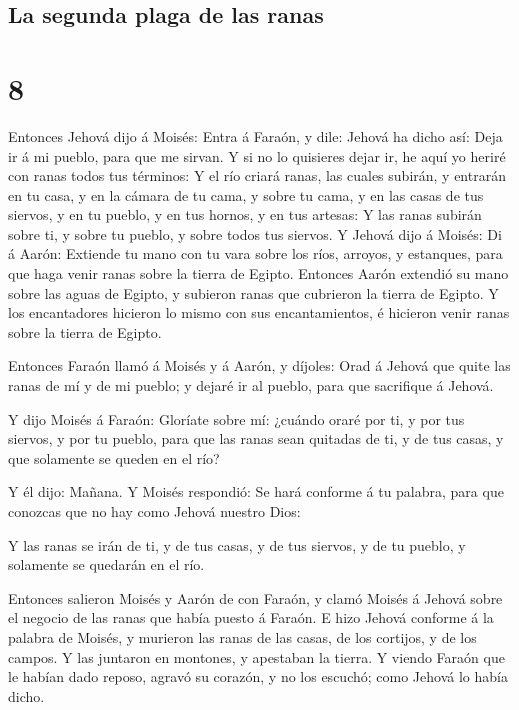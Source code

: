 \hypertarget{la-segunda-plaga-de-las-ranas}{%
\subsection{La segunda plaga de las
ranas}\label{la-segunda-plaga-de-las-ranas}}

\hypertarget{section-02-8}{%
\section{8}\label{section-02-8}}

 Entonces Jehová dijo á Moisés: Entra á Faraón, y dile:
Jehová ha dicho así: Deja ir á mi pueblo, para que me sirvan.
 Y si no lo quisieres dejar ir, he aquí yo heriré con
ranas todos tus términos:  Y el río criará ranas, las
cuales subirán, y entrarán en tu casa, y en la cámara de tu cama, y
sobre tu cama, y en las casas de tus siervos, y en tu pueblo, y en tus
hornos, y en tus artesas:  Y las ranas subirán sobre ti, y
sobre tu pueblo, y sobre todos tus siervos.  Y Jehová dijo
á Moisés: Di á Aarón: Extiende tu mano con tu vara sobre los ríos,
arroyos, y estanques, para que haga venir ranas sobre la tierra de
Egipto.  Entonces Aarón extendió su mano sobre las aguas
de Egipto, y subieron ranas que cubrieron la tierra de Egipto.
 Y los encantadores hicieron lo mismo con sus
encantamientos, é hicieron venir ranas sobre la tierra de Egipto.

 Entonces Faraón llamó á Moisés y á Aarón, y díjoles: Orad
á Jehová que quite las ranas de mí y de mi pueblo; y dejaré ir al
pueblo, para que sacrifique á Jehová.

 Y dijo Moisés á Faraón: Gloríate sobre mí: ¿cuándo oraré
por ti, y por tus siervos, y por tu pueblo, para que las ranas sean
quitadas de ti, y de tus casas, y que solamente se queden en el río?

 Y él dijo: Mañana. Y Moisés respondió: Se hará conforme
á tu palabra, para que conozcas que no hay como Jehová nuestro Dios:

 Y las ranas se irán de ti, y de tus casas, y de tus
siervos, y de tu pueblo, y solamente se quedarán en el río.

 Entonces salieron Moisés y Aarón de con Faraón, y clamó
Moisés á Jehová sobre el negocio de las ranas que había puesto á Faraón.
 E hizo Jehová conforme á la palabra de Moisés, y
murieron las ranas de las casas, de los cortijos, y de los campos.
 Y las juntaron en montones, y apestaban la tierra.
 Y viendo Faraón que le habían dado reposo, agravó su
corazón, y no los escuchó; como Jehová lo había dicho.

